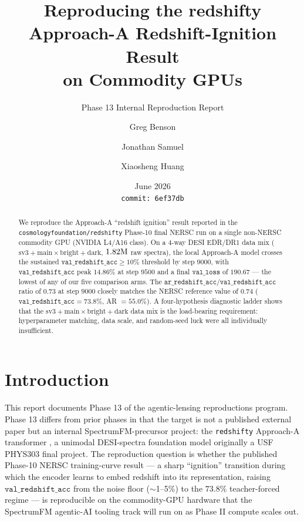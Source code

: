 \documentclass[11pt,letterpaper]{article}
\title{Reproducing the redshifty Approach-A Redshift-Ignition Result\\
       on Commodity GPUs}
\author{Greg Benson \and Jonathan Samuel \and Xiaosheng Huang}
\date{June 2026 \\ \texttt{commit:~6ef37db}}
\newcommand{\valloss}{\texttt{val\_loss}}
\newcommand{\valz}{\texttt{val\_redshift\_acc}}
\newcommand{\arz}{\texttt{ar\_redshift\_acc}}
\begin{document}
\maketitle
\subtitle{Phase 13 Internal Reproduction Report}

\begin{abstract}
We reproduce the Approach-A ``redshift ignition'' result reported in
the \texttt{cosmologyfoundation/redshifty} Phase-10 final NERSC run
\autocite{samuel2026redshifty} on a single non-NERSC commodity GPU
(NVIDIA L4/A16 class). On a 4-way DESI EDR/DR1 data mix
($\mathrm{sv3}{+}\mathrm{main} \times \mathrm{bright}{+}\mathrm{dark}$,
$1.82{\rm M}$ raw spectra), the local Approach-A model crosses the
sustained $\valz \geq 10\%$ threshold by step $9000$, with $\valz$
peak $14.86\%$ at step $9500$ and a final $\valloss$ of $190.67$
--- the lowest of any of our five comparison arms. The
$\arz/\valz$ ratio of $0.73$ at step $9000$ closely matches the
NERSC reference value of $0.74$ ($\valz = 73.8\%$, AR $= 55.0\%$).
A four-hypothesis diagnostic ladder shows that the
$\mathrm{sv3}{+}\mathrm{main} \times \mathrm{bright}{+}\mathrm{dark}$
data mix is the load-bearing requirement: hyperparameter matching,
data scale, and random-seed luck were all individually insufficient.
\end{abstract}

\tableofcontents

\bigskip

\section{Introduction}

This report documents Phase 13 of the agentic-lensing reproductions
program. Phase 13 differs from prior phases in that the target is not
a published external paper but an internal SpectrumFM-precursor
project: the \texttt{redshifty} Approach-A transformer
\autocite{samuel2026redshifty}, a unimodal DESI-spectra foundation
model originally a USF PHYS303 final project. The reproduction question
is whether the published Phase-10 NERSC training-curve result --- a
sharp ``ignition'' transition during which the encoder learns to embed
redshift into its representation, raising $\valz$ from the noise floor
($\sim$1--5\%) to the $73.8\%$ teacher-forced regime --- is
reproducible on the commodity-GPU hardware that the SpectrumFM
agentic-AI tooling track will run on as Phase II compute scales out.
\end{document}
